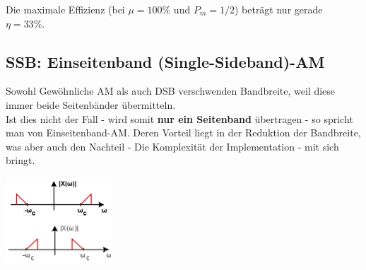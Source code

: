 Die maximale Effizienz (bei $\mu = 100\% $ und $P_m = 1/2$) beträgt nur gerade $ \eta = 33\% $. 

\subsection{SSB: Einseitenband (Single-Sideband)-AM }
	\begin{minipage}{14cm}
		Sowohl Gewöhnliche AM als auch DSB verschwenden Bandbreite, weil diese immer beide Seitenbänder übermitteln. \\ 
		Ist dies nicht der Fall - wird somit \textbf{nur ein Seitenband} übertragen - so spricht man von 	Einseitenband-AM. Deren Vorteil liegt in der Reduktion der Bandbreite, was aber auch den Nachteil 	- Die Komplexität der Implementation - mit sich bringt.
	\end{minipage}
	\begin{minipage}{5cm}
		\includegraphics[width = 4cm]{bilder/am_ssb_spektrum}
	\end{minipage}


